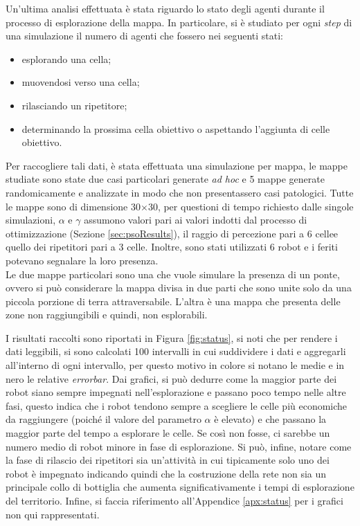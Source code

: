 Un'ultima analisi effettuata è stata riguardo lo stato degli agenti durante il processo di esplorazione della mappa.
In particolare, si è studiato per ogni \textit{step} di una simulazione il numero di agenti che fossero nei seguenti stati:
\begin{itemize}
	\item esplorando una cella;
	\item muovendosi verso una cella;
	\item rilasciando un ripetitore;
	\item determinando la prossima cella obiettivo o aspettando l'aggiunta di celle obiettivo.
\end{itemize}
Per raccogliere tali dati, è stata effettuata una simulazione per mappa, le mappe studiate sono state due casi particolari generate \textit{ad hoc} e 5 mappe generate randomicamente e analizzate in modo che non presentassero casi patologici.
Tutte le mappe sono di dimensione 30$\times$30, per questioni di tempo richiesto dalle singole simulazioni, $\alpha$ e $\gamma$ assumono valori pari ai valori indotti dal processo di ottimizzazione (Sezione \ref{sec:psoResults}), il raggio di percezione pari a 6 cellee quello dei ripetitori pari a 3 celle.
Inoltre, sono stati utilizzati 6 robot e i feriti potevano segnalare la loro presenza.\\
Le due mappe particolari sono una che vuole simulare la presenza di un ponte, ovvero si può considerare la mappa divisa in due parti che sono unite solo da una piccola porzione di terra attraversabile.
L'altra è una mappa che presenta delle zone non raggiungibili e quindi, non esplorabili.

I risultati raccolti sono riportati in Figura \ref{fig:status}, si noti che per rendere i dati leggibili, si sono calcolati 100 intervalli in cui suddividere i dati e aggregarli all'interno di ogni intervallo, per questo motivo in colore si notano le medie e in nero le relative \textit{errorbar}.
Dai grafici, si può dedurre come la maggior parte dei robot siano sempre impegnati nell'esplorazione e passano poco tempo nelle altre fasi, questo indica che i robot tendono sempre a scegliere le celle più economiche da raggiungere (poiché il valore del parametro $\alpha$ è elevato) e che passano la maggior parte del tempo a esplorare le celle.
Se così non fosse, ci sarebbe un numero medio di robot minore in fase di esplorazione.
Si può, infine, notare come la fase di rilascio dei ripetitori sia un'attività in cui tipicamente solo uno dei robot è impegnato indicando quindi che la costruzione della rete non sia un principale collo di bottiglia che aumenta significativamente i tempi di esplorazione del territorio.
Infine, si faccia riferimento all'Appendice \ref{apx:status} per i grafici non qui rappresentati.

